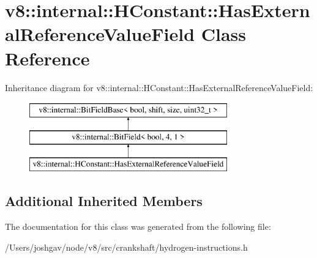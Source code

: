 \hypertarget{classv8_1_1internal_1_1_h_constant_1_1_has_external_reference_value_field}{}\section{v8\+:\+:internal\+:\+:H\+Constant\+:\+:Has\+External\+Reference\+Value\+Field Class Reference}
\label{classv8_1_1internal_1_1_h_constant_1_1_has_external_reference_value_field}
Inheritance diagram for v8\+:\+:internal\+:\+:H\+Constant\+:\+:Has\+External\+Reference\+Value\+Field\+:\begin{figure}[H]
\begin{center}
\leavevmode
\includegraphics[height=3.000000cm]{classv8_1_1internal_1_1_h_constant_1_1_has_external_reference_value_field}
\end{center}
\end{figure}
\subsection*{Additional Inherited Members}


The documentation for this class was generated from the following file\+:\begin{DoxyCompactItemize}
\item 
/\+Users/joshgav/node/v8/src/crankshaft/hydrogen-\/instructions.\+h\end{DoxyCompactItemize}
